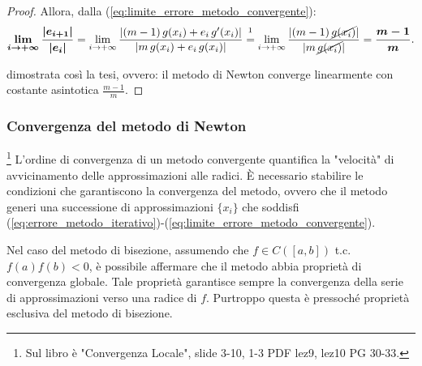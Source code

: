 \begin{proof}
	
	
	
	\noindent Allora, dalla (\ref{eq:limite_errore_metodo_convergente}):
	\begin{equation} \label{eq:limCostanteAsistotica}
		\boldsymbol{\lim_{i\to + \infty}{\frac{|e_{i+1}|}{|e_i|}}}=\lim_{i\to + \infty}{\frac{|(m-1)\,g(x_i)+e_i\,g'(x_i)|}{|m\,g(x_i)+e_i\,g(x_i)|}}\overset{\footnotemark}{=}\lim_{i\to + \infty}{\frac{|(m-1)\,\cancel{g(x_i)}|}{|m\,\cancel{g(x_i)}|}}=\boldsymbol{\frac{m-1}{m}}.
	\end{equation}
	
	
	 dimostrata così la tesi, ovvero: il metodo di Newton converge linearmente con costante asintotica $\frac{m-1}{m}$.
\end{proof}

\subsubsection{Convergenza del metodo di Newton}\footnote{Sul libro è "Convergenza Locale", slide 3-10, 1-3 PDF lez9, lez10 PG 30-33.} 
L'ordine di convergenza di un metodo convergente quantifica la "velocità" di avvicinamento delle approssimazioni alle radici. È necessario stabilire le condizioni che garantiscono la convergenza del metodo, ovvero che il metodo generi una successione di approssimazioni $\{x_i\}$ che soddisfi (\ref{eq:errore_metodo_iterativo})-(\ref{eq:limite_errore_metodo_convergente}).

Nel caso del metodo di bisezione, assumendo che $f\in C([a,b])$ t.c. $f(a)f(b)<0$, è possibile affermare che il metodo abbia proprietà di convergenza globale. Tale proprietà garantisce sempre la convergenza della serie di approssimazioni verso una radice di $f$. Purtroppo questa è pressoché proprietà esclusiva del metodo di bisezione.


